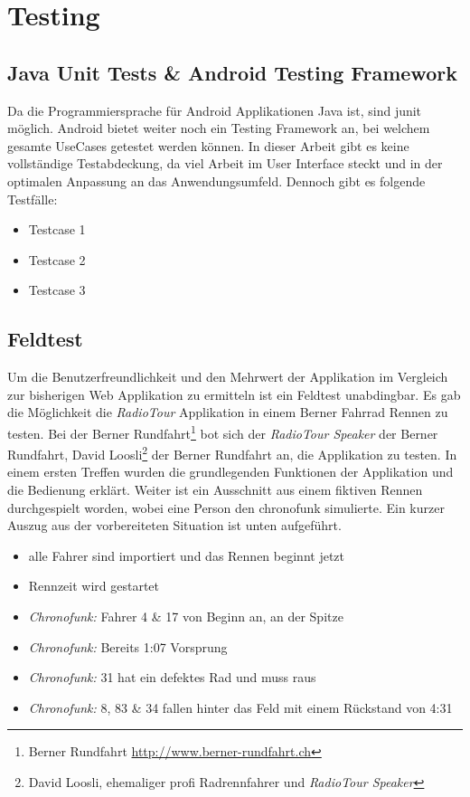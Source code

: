 \chapter{Testing}

\section{Java Unit Tests \& Android Testing Framework}

Da die Programmiersprache für Android Applikationen Java ist, sind \gls{junit} möglich. Android bietet weiter noch ein Testing Framework an, bei welchem gesamte UseCases getestet werden können. In dieser Arbeit gibt es keine vollständige Testabdeckung, da viel Arbeit im User Interface steckt und in der optimalen Anpassung an das Anwendungsumfeld. Dennoch gibt es folgende Testfälle:

\begin{itemize}
\item Testcase 1
\item Testcase 2
\item Testcase 3
\end{itemize}

\section{Feldtest}
Um die Benutzerfreundlichkeit und den Mehrwert der Applikation im Vergleich zur bisherigen Web Applikation zu ermitteln ist ein Feldtest unabdingbar. Es gab die Möglichkeit die \textit{RadioTour} Applikation in einem Berner Fahrrad Rennen zu testen. Bei der Berner Rundfahrt\footnote{Berner Rundfahrt \url{http://www.berner-rundfahrt.ch}} bot sich der  \textit{RadioTour Speaker} der Berner Rundfahrt, David Loosli\footnote{David Loosli, ehemaliger profi Radrennfahrer und \textit{RadioTour Speaker}} der Berner Rundfahrt an, die Applikation zu testen. In einem ersten Treffen wurden die grundlegenden Funktionen der Applikation und die Bedienung erklärt. Weiter ist ein Ausschnitt aus einem fiktiven Rennen durchgespielt worden, wobei eine Person den \gls{chronofunk} simulierte. Ein kurzer Auszug aus der vorbereiteten Situation ist unten aufgeführt.

\begin{itemize}
\item alle Fahrer sind importiert und das Rennen beginnt jetzt
\item Rennzeit wird gestartet
\item \textit{Chronofunk:} Fahrer 4 \& 17 von Beginn an, an der Spitze
\item \textit{Chronofunk:} Bereits 1:07 Vorsprung
\item \textit{Chronofunk:} 31 hat ein defektes Rad und muss raus
\item \textit{Chronofunk:} 8, 83 \& 34 fallen hinter das Feld mit einem Rückstand von 4:31
\end{itemize}


